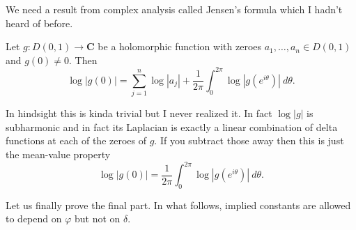 \documentclass[12pt]{article}
\begin{document}
We need a result from complex analysis called Jensen's formula which I hadn't heard of before.
\begin{theorem}
Let $g: D(0, 1) \to \mathbf C$ be a holomorphic function with zeroes $a_1, \dots, a_n \in D(0, 1)$ and $g(0) \neq 0$. Then
$$\log |g(0)| = \sum_{j=1}^n \log |a_j| + \frac{1}{2\pi} \int_0^{2\pi} \log |g(e^{i\theta})| ~d\theta.$$
\end{theorem}
In hindsight this is kinda trivial but I never realized it. In fact $\log |g|$ is subharmonic and in fact its Laplacian is exactly a linear combination of delta functions at each of the zeroes of $g$. If you subtract those away then this is just the mean-value property
$$\log |g(0)| = \frac{1}{2\pi} \int_0^{2\pi} \log |g(e^{i\theta})| ~d\theta.$$

Let us finally prove the final part.
In what follows, implied constants are allowed to depend on $\varphi$ but not on $\delta$.
\end{document}

